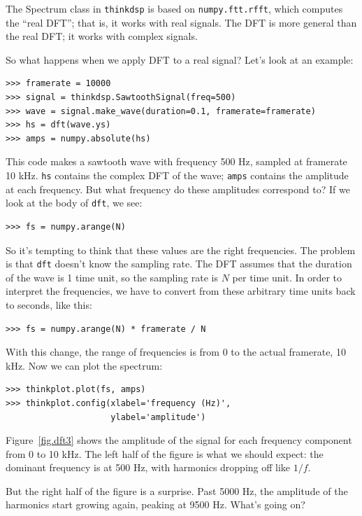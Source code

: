 \documentclass[12pt]{book}
\begin{document}
The Spectrum class in {\tt thinkdsp} is based on {\tt numpy.ftt.rfft},
which computes the ``real DFT''; that is, it works with real signals.
The DFT is more general than the real DFT; it works with complex
signals.

So what happens when we apply DFT to a real signal?  Let's look at
an example:

\begin{verbatim}
>>> framerate = 10000
>>> signal = thinkdsp.SawtoothSignal(freq=500)
>>> wave = signal.make_wave(duration=0.1, framerate=framerate)
>>> hs = dft(wave.ys)
>>> amps = numpy.absolute(hs)
\end{verbatim}

This code makes a sawtooth wave with frequency 500 Hz, sampled at
framerate 10 kHz.  {\tt hs} contains the complex DFT of the wave;
{\tt amps} contains the amplitude at each frequency.  But what
frequency do these amplitudes correspond to?  If we look at the
body of {\tt dft}, we see:

\begin{verbatim}
>>> fs = numpy.arange(N)
\end{verbatim}

So it's tempting to think that these values are the right frequencies.
The problem is that {\tt dft} doesn't know the sampling rate.  The
DFT assumes that the duration of the wave is 1 time unit, so the sampling
rate is $N$ per time unit.  In order to interpret the frequencies,
we have to convert from these arbitrary time units back to seconds,
like this:

\begin{verbatim}
>>> fs = numpy.arange(N) * framerate / N
\end{verbatim}

With this change, the range of frequencies is from 0 to the actual
framerate, 10 kHz.  Now we can plot the spectrum:

\begin{verbatim}
>>> thinkplot.plot(fs, amps)
>>> thinkplot.config(xlabel='frequency (Hz)', 
                     ylabel='amplitude')
\end{verbatim}

Figure~\ref{fig.dft3} shows the amplitude of the signal for each
frequency component from 0 to 10 kHz.  The left half of the figure
is what we should expect: the dominant frequency is at 500 Hz, with
harmonics dropping off like $1/f$.

But the right half of the figure is a surprise.  Past 5000 Hz, the
amplitude of the harmonics start growing again, peaking at 9500 Hz.
What's going on?
\end{document}
